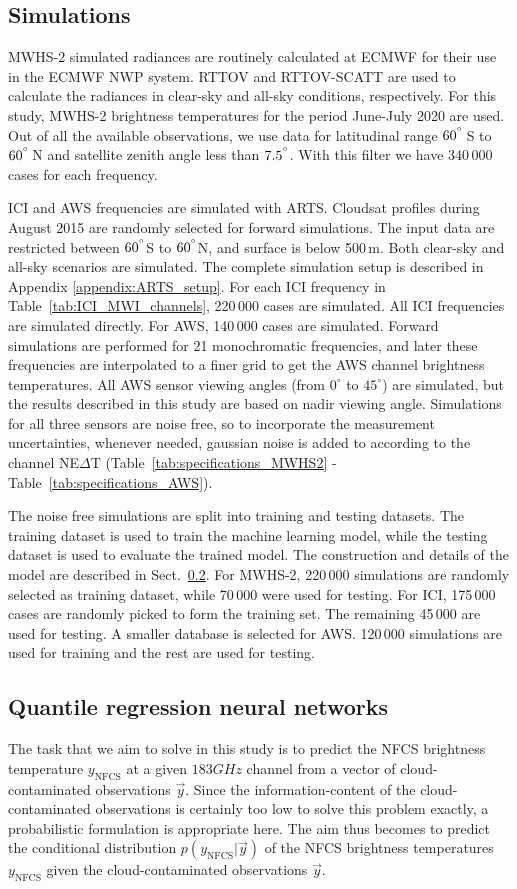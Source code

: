 \documentclass[amt, manuscript]{copernicus}
\newcommand{\ynfcs}{y_\text{NFCS}}
\newcommand{\y}{\vec{y}}
\begin{document}
\subsection{Simulations}
%
MWHS-2 simulated radiances are routinely calculated at ECMWF for their use in the ECMWF NWP system. RTTOV and RTTOV-SCATT are used to calculate the radiances in clear-sky and all-sky conditions, respectively. For this study, MWHS-2 brightness temperatures for the period June-July 2020 are used. Out of all the available observations, we use data for latitudinal range $60^{^{\circ}}$\,S to $60^{^{\circ}}$\,N and satellite zenith angle less than $7.5^{^{\circ}}$. With this filter we have 340\,000 cases for each frequency. 

ICI and AWS frequencies are simulated with ARTS. Cloudsat profiles during August 2015 are randomly selected for forward simulations. The input data are restricted between $60^{^{\circ}}$S to $60^{^{\circ}}$N, and surface is below 500\,m. Both clear-sky and all-sky scenarios  are simulated. The complete simulation setup is described in Appendix \ref{appendix:ARTS_setup}. For each ICI frequency in Table~\ref{tab:ICI_MWI_channels}, 220\,000 cases are simulated. All ICI frequencies are simulated directly. For AWS, 140\,000 cases are simulated. Forward simulations are performed for 21 monochromatic frequencies, and later these frequencies are interpolated to a finer grid to get the AWS channel brightness temperatures. All AWS sensor viewing angles (from $0^\circ$ to $45^\circ$) are simulated, but the results described in this study are based on nadir viewing angle. Simulations for all three sensors are noise free, so to incorporate the measurement uncertainties, whenever needed, gaussian noise is added to according to the channel NE$\Delta$T (Table~\ref{tab:specifications_MWHS2} - Table~\ref{tab:specifications_AWS}). 

The noise free simulations are split into training and testing datasets. The training dataset is used to train the machine learning model, while the testing dataset is used to evaluate the trained model. The construction and details of the model are described in Sect.~\ref{sec:QRNN}. For MWHS-2, 220\,000 simulations are randomly selected as training dataset, while 70\,000 were used for testing. For ICI, 175\,000 cases are randomly picked to form the training set. The remaining 45\,000 are used for testing. A smaller database is selected for AWS. 120\,000 simulations are used for training and the rest are used for testing.

\subsection{Quantile regression neural networks}
\label{sec:QRNN}
%
The task that we aim to solve in this study is to predict the NFCS brightness
temperature $\ynfcs$ at a given $183\unit{GHz}$ channel from a vector of
cloud-contaminated observations $\y$. Since the information-content of the
cloud-contaminated observations is certainly too low to solve this problem
exactly, a probabilistic formulation is appropriate here. The aim thus becomes
to predict the conditional distribution $p(\ynfcs | \y)$ of the NFCS brightness
temperatures $\ynfcs$ given the cloud-contaminated observations $\y$.
\end{document}
